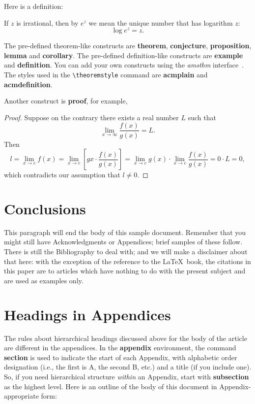 Here is a definition:
\begin{definition}
  If $z$ is irrational, then by $e^z$ we mean the
  unique number that has
  logarithm $z$:
  \begin{displaymath}
    \log e^z = z.
  \end{displaymath}
\end{definition}

The pre-defined theorem-like constructs are \textbf{theorem},
\textbf{conjecture}, \textbf{proposition}, \textbf{lemma} and
\textbf{corollary}.  The pre-defined de\-fi\-ni\-ti\-on-like constructs are
\textbf{example} and \textbf{definition}.  You can add your own
constructs using the \textsl{amsthm} interface~\cite{Amsthm15}.  The
styles used in the \verb|\theoremstyle| command are \textbf{acmplain}
and \textbf{acmdefinition}.

Another construct is \textbf{proof}, for example,

\begin{proof}
  Suppose on the contrary there exists a real number $L$ such that
  \begin{displaymath}
    \lim_{x\rightarrow\infty} \frac{f(x)}{g(x)} = L.
  \end{displaymath}
  Then
  \begin{displaymath}
    l=\lim_{x\rightarrow c} f(x)
    = \lim_{x\rightarrow c}
    \left[ g{x} \cdot \frac{f(x)}{g(x)} \right ]
    = \lim_{x\rightarrow c} g(x) \cdot \lim_{x\rightarrow c}
    \frac{f(x)}{g(x)} = 0\cdot L = 0,
  \end{displaymath}
  which contradicts our assumption that $l\neq 0$.
\end{proof}

\section{Conclusions}
This paragraph will end the body of this sample document.
Remember that you might still have Acknowledgments or
Appendices; brief samples of these
follow.  There is still the Bibliography to deal with; and
we will make a disclaimer about that here: with the exception
of the reference to the \LaTeX\ book, the citations in
this paper are to articles which have nothing to
do with the present subject and are used as
examples only.



\appendix
\section{Headings in Appendices}
The rules about hierarchical headings discussed above for
the body of the article are different in the appendices.
In the \textbf{appendix} environment, the command
\textbf{section} is used to
indicate the start of each Appendix, with alphabetic order
designation (i.e., the first is A, the second B, etc.) and
a title (if you include one).  So, if you need
hierarchical structure
\textit{within} an Appendix, start with \textbf{subsection} as the
highest level. Here is an outline of the body of this
document in Appendix-appropriate form:
